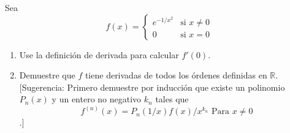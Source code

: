\item Sea
    $$f(x) = \begin{cases} 
    e^{-1/x^2} & \text{si } x \ne 0 \\
    0 & \text{si } x = 0 
    \end{cases}$$
    \begin{enumerate}
        \item[(a)] Use la definición de derivada para calcular $f'(0)$.
        \item[(b)] Demuestre que $f$ tiene derivadas de todos los órdenes definidas en $\mathbb{R}$. [Sugerencia: Primero demuestre por inducción que existe un polinomio $P_n(x)$ y un entero no negativo $k_n$ tales que
            $$f^{(n)}(x) = P_n(1/x) f(x) / x^{k_n} \text{ Para } x \ne 0$$.]
    \end{enumerate}
